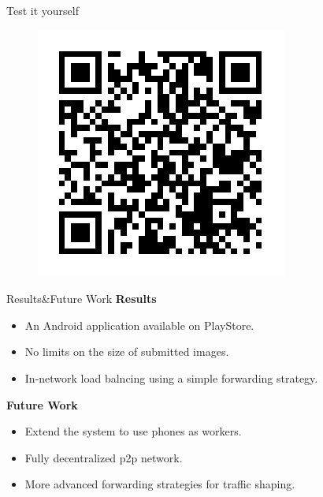 \documentclass[final]{beamer}
\newlength{\onecolwid}
\begin{document}
\begin{frame}[t]
\begin{columns}[t]
\begin{column}{\onecolwid}
\begin{block}{Test it yourself}
\begin{figure}
\includegraphics[width=0.5\linewidth]{img/qr}
\end{figure}
\end{block}





\begin{alertblock}{Results\&Future Work}
\textbf{Results}
\begin{itemize}
\item An Android application available on PlayStore.
\item No limits on the size of submitted images.
\item In-network load balncing using a simple forwarding strategy. 
\end{itemize}
\textbf{Future Work}
\begin{itemize}
\item Extend the system to use phones as workers.
\item Fully decentralized p2p network.
\item More advanced forwarding strategies for traffic shaping. 
\end{itemize}

\end{alertblock}



\end{column}
\end{columns}
\end{frame}
\end{document}
